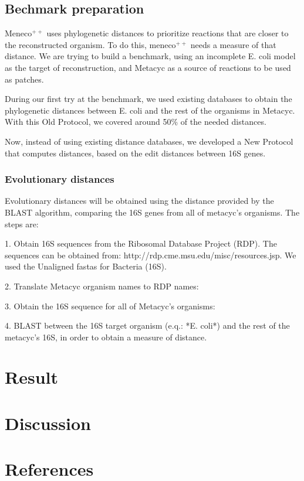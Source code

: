 \documentclass{article}
\newcommand{\Meneco}{Meneco$^{++}$\xspace}
\newcommand{\meneco}{meneco$^{++}$\xspace}
\begin{document}
\subsection{Bechmark preparation}

\Meneco uses phylogenetic distances to prioritize reactions that are closer to the reconstructed organism. To do this, \meneco needs a measure of that distance. We are trying to build a benchmark, using an incomplete E. coli model as the target of reconstruction, and Metacyc as a source of reactions to be used as patches.

During our first try at the benchmark, we used existing databases to obtain the phylogenetic distances between E. coli and the rest of the organisms in Metacyc. With this Old Protocol, we covered around 50\% of the needed distances.

Now, instead of using existing distance databases, we developed a New Protocol that computes distances, based on the edit distances between 16S genes.


\subsubsection{Evolutionary distances}

Evolutionary distances will be obtained using the distance provided by the BLAST algorithm, comparing the 16S genes from all of metacyc's organisms. The steps are:

1. Obtain 16S sequences from the Ribosomal Database Project (RDP). The sequences can be obtained from: http://rdp.cme.msu.edu/misc/resources.jsp. We used the Unaligned fastas for Bacteria (16S).

2. Translate Metacyc organism names to RDP names:

3. Obtain the 16S sequence for all of Metacyc's organisms:

4. BLAST between the 16S target organism (e.q.: *E. coli*) and the rest of the metacyc's 16S, in order to obtain a measure of distance.



\section{Result}


\section{Discussion}

\section{References}
\end{document}
